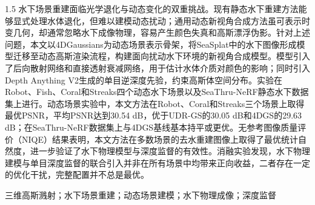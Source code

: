 
\begin{zhaiyao}
\begin{spacing}{1.5}
{
水下场景重建面临光学退化与动态变化的双重挑战。现有静态水下重建方法能够显式处理水体退化，但难以建模动态扰动；通用动态新视角合成方法虽可表示时变几何，却通常忽略水下成像物理，容易产生颜色失真和高斯漂浮伪影。针对上述问题，本文以4DGaussians为动态场景表示骨架，将SeaSplat中的水下图像形成模型迁移至动态高斯渲染流程，构建面向扰动水下环境的新视角合成模型。模型引入了后向散射网络和直接透射衰减网络，用于估计水体介质对颜色的影响；同时引入Depth Anything V2生成的单目逆深度先验，约束高斯体空间分布。实验在Robot、Fish、Coral和Streaks四个动态水下场景以及SeaThru-NeRF静态水下数据集上进行。动态场景实验中，本文方法在Robot、Coral和Streaks三个场景上取得最优PSNR，平均PSNR达到30.54 dB，优于UDR-GS的30.05 dB和4DGS的29.63 dB；在SeaThru-NeRF数据集上与4DGS基线基本持平或更优。无参考图像质量评价（NIQE）结果表明，本文方法在多数场景的去水重建图像上取得了最优统计自然度，进一步验证了水下物理模型与深度监督的有效性。消融实验发现，水下物理建模与单目深度监督的联合引入并非在所有场景中均带来正向收益，二者存在一定的优化干扰，完整配置并不总是最优。
}
\end{spacing}
\end{zhaiyao}


\begin{guanjianci}
三维高斯溅射；水下场景重建；动态场景建模；水下物理成像；深度监督
\end{guanjianci}


